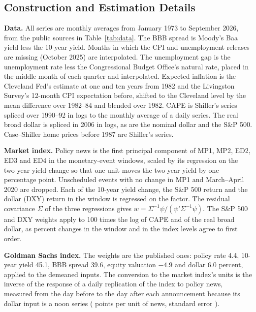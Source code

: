 \documentclass[11pt]{article}
\begin{document}
\FloatBarrier
\newpage
\begin{appendices}
\renewcommand{\thetable}{\Alph{section}\arabic{table}}
\renewcommand{\thefigure}{\Alph{section}\arabic{figure}}
\FloatBarrier

\section{Construction and Estimation Details}\label{app:details}
\textbf{Data.} All series are monthly averages from January 1973 to September 2026, from the public sources in Table~\ref{tab:data}. The BBB spread is Moody's Baa yield less the 10-year yield. Months in which the CPI and unemployment releases are missing (October 2025) are interpolated. The unemployment gap is the unemployment rate less the Congressional Budget Office's natural rate, placed in the middle month of each quarter and interpolated. Expected inflation is the Cleveland Fed's estimate at one and ten years from 1982 and the Livingston Survey's 12-month CPI expectation before, shifted to the Cleveland level by the mean difference over 1982--84 and blended over 1982. CAPE is Shiller's series spliced over 1990--92 in logs to the monthly average of a daily series. The real broad dollar is spliced in 2006 in logs, as are the nominal dollar and the S\&P 500. Case--Shiller home prices before 1987 are Shiller's series.

\textbf{Market index.} Policy news is the first principal component of MP1, MP2, ED2, ED3 and ED4 in the monetary-event windows, scaled by its regression on the two-year yield change so that one unit moves the two-year yield by one percentage point. Unscheduled events with no change in MP1 and March--April 2020 are dropped. Each of the 10-year yield change, the S\&P 500 return and the dollar (DXY) return in the window is regressed on the factor. The residual covariance $\Sigma$ of the three regressions gives $w=\Sigma^{-1}\psi/(\psi'\Sigma^{-1}\psi)$. The S\&P 500 and DXY weights apply to 100 times the log of CAPE and of the real broad dollar, as percent changes in the window and in the index levels agree to first order.

\textbf{Goldman Sachs index.} The weights are the published ones: policy rate 4.4, 10-year yield 45.1, BBB spread 39.6, equity valuation $-4.9$ and dollar 6.0 percent, applied to the demeaned inputs. The conversion to the market index's units is the inverse of the response of a daily replication of the index to policy news, measured from the day before to the day after each announcement because its dollar input is a noon series ( points per unit of news, standard error ).


\end{appendices}
\end{document}
